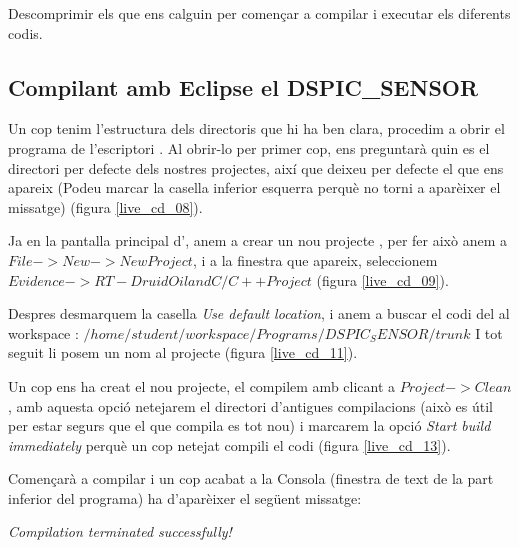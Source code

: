 Descomprimir els que ens calguin per començar a compilar i executar els diferents codis.

\subsection{Compilant amb Eclipse el DSPIC\_SENSOR}\label{cap:gui:cd:comp:ecl:sensor}

Un cop tenim l'estructura dels directoris que hi ha ben clara, procedim a obrir el programa de l'escriptori \Eclipse.
Al obrir-lo per primer cop, ens preguntarà quin es el directori per defecte dels nostres projectes, així que deixeu per defecte el que ens apareix (Podeu marcar la casella inferior esquerra perquè no torni a aparèixer el missatge) (figura \ref{live_cd_08}).

Ja en la pantalla principal d'\Eclipse, anem a crear un nou projecte \RTDruid, per fer això anem a $File->New->New Project$, i a la finestra que apareix, seleccionem $Evidence->RT-Druid Oil and C/C++ Project$ (figura \ref{live_cd_09}).

Despres desmarquem la casella \emph{Use default location}, i anem a buscar el codi del \Sensor al workspace :
$/home/student/workspace/Programs/DSPIC_SENSOR/trunk$
I tot seguit li posem un nom al projecte (figura \ref{live_cd_11}).

Un cop ens ha creat el nou projecte, el compilem amb clicant a $Project->Clean$, amb aquesta opció netejarem el directori d'antigues compilacions (això es útil per estar segurs que el que compila es tot nou) i marcarem la opció \emph{Start build immediately} perquè un cop netejat compili el codi (figura \ref{live_cd_13}).

Començarà a compilar i un cop acabat a la Consola (finestra de text de la part inferior del programa) ha d'aparèixer el següent missatge:

\emph{Compilation terminated successfully!}


